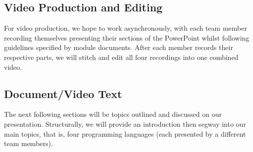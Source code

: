 \subsection{Video Production and Editing}
For video production, we hope to work asynchronously, with each team member recording themselves presenting their sections of the PowerPoint whilst following guidelines specified by module documents. After each member records their respective parts, we will stitch and edit all four recordings into one combined video.

\subsection{Document/Video Text}
The next following sections will be topics outlined and discussed on our presentation. Structurally,  we will provide an introduction then segway into our main topics, that is, four programming languages (each presented by a different team members).


